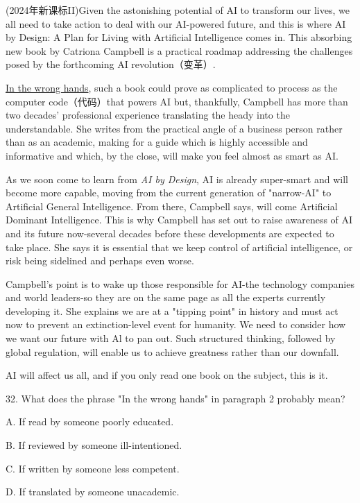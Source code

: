 \documentclass[a4paper]{ctexart}
\begin{document}
(2024年新课标II)Given the astonishing potential of AI to transform our lives, we all need to take action to deal with our AI-powered future, and this is where AI by Design: A Plan for Living with Artificial Intelligence comes in. This absorbing new book by Catriona Campbell is a practical roadmap addressing the challenges posed by the forthcoming AI revolution（变革）. 

\underline{In the wrong hands}, such a book could prove as complicated to process as the computer code（代码）that powers AI but, thankfully, Campbell has more than two decades' professional experience translating the heady into the understandable. She writes from the practical angle of a business person rather than as an academic, making for a guide which is highly accessible and informative and which, by the close, will make you feel almost as smart as AI. 

As we soon come to learn from \textit{AI by Design}, AI is already super-smart and will become more capable, moving from the current generation of "narrow-AI" to Artificial General Intelligence. From there, Campbell says, will come Artificial Dominant Intelligence. This is why Campbell has set out to raise awareness of AI and its future now-several decades before these developments are expected to take place. She says it is essential that we keep control of artificial intelligence, or risk being sidelined and perhaps even worse. 

Campbell's point is to wake up those responsible for AI-the technology companies and world leaders-so they are on the same page as all the experts currently developing it. She explains we are at a "tipping point" in history and must act now to prevent an extinction-level event for humanity. We need to consider how we want our future with Al to pan out. Such structured thinking, followed by global regulation, will enable us to achieve greatness rather than our downfall. 

AI will affect us all, and if you only read one book on the subject, this is it. 


32. What does the phrase "In the wrong hands" in paragraph 2 probably mean? 

A. If read by someone poorly educated.    
     
B. If reviewed by someone ill-intentioned.

C. If written by someone less competent.       
  
D. If translated by someone unacademic. 
\end{document}

